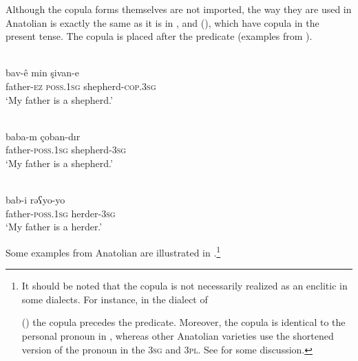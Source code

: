 \documentclass[output=paper]{langsci/langscibook}
\begin{document}
Although the {copula} forms themselves are not imported, the way they are used in Anatolian  is exactly the same as it is in ,  and  (), which have {copula} in the present {tense}. The {copula} is placed after the predicate (examples from \citealt{Grigore2007article}).


\begin{exe}
\ex \label{cop}
		\begin{xlist}
		\ex {} \\\label{copkrm}\gll bav-ê min şivan-e		\\
    father-\textsc{ez} \textsc{poss.1sg}		shepherd-\textsc{cop.3sg} \\
       \glt `My father is a shepherd.'

	\ex {} \\
	\label{coptk} \gll baba-m 		çoban-dır\\
	father-\textsc{poss.1sg}		shepherd-\textsc{3sg}\\
        \glt  `My father is a shepherd.'


		\ex {}\\ \label{copara} \gll  bab-i		rəʕyo-yo\\
		father-\textsc{poss.1sg}		herder-\textsc{3sg}\\
      \glt  `My father is a herder.'
        \end{xlist}

\end{exe}


\noindent Some examples from Anatolian  are illustrated in .\footnote{It should be noted that the {copula} is not necessarily realized as an enclitic in some dialects. For instance, in the dialect of

 (\citealt{Jastrow2011anatolian}) the {copula} precedes the
predicate. Moreover, the {copula} is identical to the personal pronoun in , whereas other Anatolian varieties use the shortened version of the pronoun in the 3\textsc{sg} and 3\textsc{pl}. See \cite{Akkus2016} for some discussion. }
\end{document}
